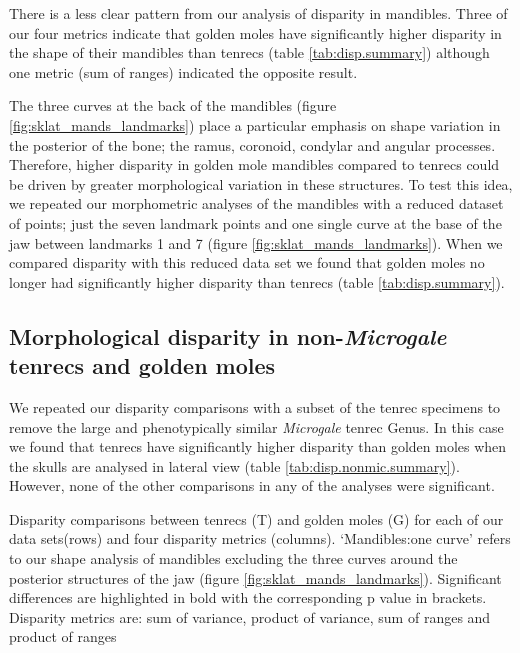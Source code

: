 \documentclass[12pt,a4paper]{article}
\begin{document}

	
	
	There is a less clear pattern from our analysis of disparity in mandibles. Three of our four metrics indicate that golden moles have significantly higher disparity in the shape of their mandibles than tenrecs (table \ref{tab:disp.summary}) although one metric (sum of ranges) indicated the opposite result. 
	
	The three curves at the back of the mandibles (figure \ref{fig:sklat_mands_landmarks}) place a particular emphasis on shape variation in the posterior of the bone; the ramus, coronoid, condylar and angular processes. Therefore, higher disparity in golden mole mandibles compared to tenrecs could be driven by greater morphological variation in these structures. To test this idea, we repeated our morphometric analyses of the mandibles with a reduced dataset of points; just the seven landmark points and one single curve at the base of the jaw between landmarks 1 and 7 (figure \ref{fig:sklat_mands_landmarks}). When we compared disparity with this reduced data set we found that golden moles no longer had significantly higher disparity than tenrecs (table \ref{tab:disp.summary}).
	
\subsection{Morphological disparity in non-\textit{Microgale} tenrecs and golden moles} 	   
	We repeated our disparity comparisons with a subset of the tenrec specimens to remove the large and phenotypically similar \textit{Microgale} tenrec Genus. In this case we found that tenrecs have significantly higher disparity than golden moles when the skulls are analysed in lateral view (table \ref{tab:disp.nonmic.summary}). However, none of the other comparisons in any of the analyses were significant. 



	\begin{table}[h]			
	\caption[Summary of disparity comparisons between tenrecs and golden moles]
		{Disparity comparisons between tenrecs (T) and golden moles (G) for each of our data sets(rows) and four disparity metrics (columns). `Mandibles:one curve' refers to our shape analysis of mandibles excluding the three curves around the posterior structures of the jaw (figure \ref{fig:sklat_mands_landmarks}). Significant differences are highlighted in bold with the corresponding p value in brackets. Disparity metrics are: sum of variance, product of variance, sum of ranges and product of ranges }
	\centering
	 
	\label{tab:disp.summary}  
	\end{table}
\end{document}
